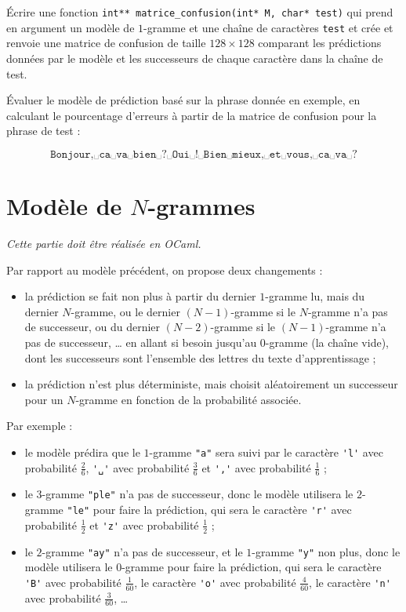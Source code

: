 \documentclass[10pt]{article}
\begin{document}
\begin{Exercise}
Écrire une fonction \verb"int** matrice_confusion(int* M, char* test)" qui prend en argument un modèle de $1$-gramme et une chaîne de caractères \verb"test" et crée et renvoie une matrice de confusion de taille $128\times 128$ comparant les prédictions données par le modèle et les successeurs de chaque caractère dans la chaîne de test.
\end{Exercise}

\begin{Exercise}
Évaluer le modèle de prédiction basé sur la phrase donnée en exemple, en calculant le pourcentage d'erreurs à partir de la matrice de confusion pour la phrase de test :

$$\texttt{Bonjour,␣ca␣va␣bien␣?␣Oui␣!␣Bien␣mieux,␣et␣vous,␣ca␣va␣?}$$
\end{Exercise}

\section{Modèle de $N$-grammes}

\textit{Cette partie doit être réalisée en OCaml.}

Par rapport au modèle précédent, on propose deux changements :
\begin{itemize}
\item la prédiction se fait non plus à partir du dernier $1$-gramme lu, mais du dernier $N$-gramme, ou le dernier $(N-1)$-gramme si le $N$-gramme n'a pas de successeur, ou du dernier $(N-2)$-gramme si le $(N-1)$-gramme n'a pas de successeur, … en allant si besoin jusqu'au $0$-gramme (la chaîne vide), dont les successeurs sont l'ensemble des lettres du texte d'apprentissage ;
\item la prédiction n'est plus déterministe, mais choisit aléatoirement un successeur pour un $N$-gramme en fonction de la probabilité associée.
\end{itemize}

Par exemple :
\begin{itemize}
\item le modèle prédira que le $1$-gramme \verb|"a"| sera suivi par le caractère \verb|'l'| avec probabilité $\frac{2}{6}$, \verb|'␣'| avec probabilité $\frac36$ et \verb|','| avec probabilité $\frac16$ ;
\item le $3$-gramme \verb|"ple"| n'a pas de successeur, donc le modèle utilisera le $2$-gramme \verb|"le"| pour faire la prédiction, qui sera le caractère \verb|'r'| avec probabilité $\frac12$ et \verb|'z'| avec probabilité $\frac12$ ;
\item le $2$-gramme \verb|"ay"| n'a pas de successeur, et le $1$-gramme \verb|"y"| non plus, donc le modèle utilisera le $0$-gramme pour faire la prédiction, qui sera le caractère \verb|'B'| avec probabilité $\frac1{60}$, le caractère \verb|'o'| avec probabilité $\frac4{60}$, le caractère \verb|'n'| avec probabilité $\frac3{60}$, …
\end{itemize}
\end{document}
